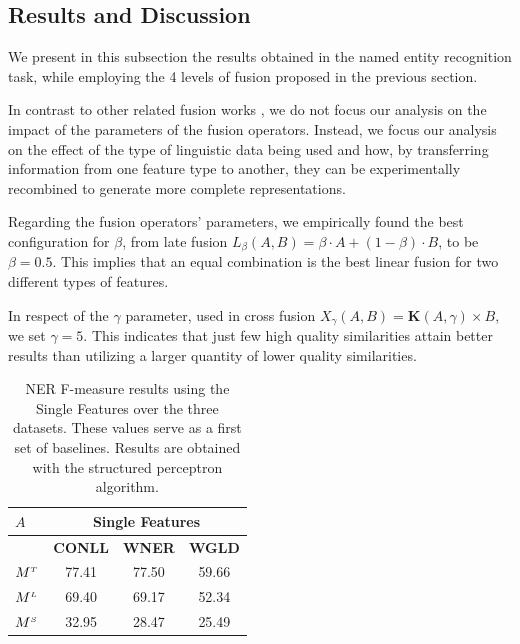 \subsection{Results and Discussion}
We present in this subsection the results obtained in the named entity recognition task, while employing the 4 levels of fusion proposed in the previous section.

In contrast to other related fusion works \cite{Ah-PineCC15,ClinchantAC11,GialampoukidisM16}, we do not focus our analysis on the impact of the parameters of the fusion operators. Instead, we focus our analysis on the effect of the type of linguistic data being used and how, by transferring information from one feature type to another, they can be experimentally recombined to generate more complete representations.

Regarding the fusion operators' parameters, we empirically found the best configuration for $\beta$, from late fusion $L_\beta(A,B) = \beta \cdot A + (1 - \beta)\cdot B$, to be $\beta=0.5$. This implies that an equal combination is the best linear fusion for two different types of features.

In respect of the $\gamma$ parameter, used in cross fusion $X_{\gamma}(A,B) = \mathbf{K}(A,\gamma) \times B$, we set $\gamma=5$. This indicates that just few high quality similarities attain better results than utilizing a larger quantity of lower quality similarities.

\begin{table}[!tbp]
\centering
\caption{NER F-measure results using the Single Features over the three datasets. These values serve as a first set of baselines. Results are obtained with the structured perceptron algorithm.}
\label{tab:ner-blines}
\begin{tabular}{@{}lccc@{}}
\toprule
$A$                           & \multicolumn{3}{c}{\textbf{Single Features}} \\ \midrule
                & \textbf{CONLL}    & \textbf{WNER}     & \textbf{WGLD}    \\ \cmidrule{2-4}
$M^{\scriptscriptstyle T}$                        & 77.41    & 77.50    & 59.66   \\
$M^{\scriptscriptstyle L}$                       & 69.40    & 69.17    & 52.34   \\
$M^{\scriptscriptstyle S}$                        & 32.95    & 28.47    & 25.49   \\ \bottomrule
\end{tabular}

\end{table}
